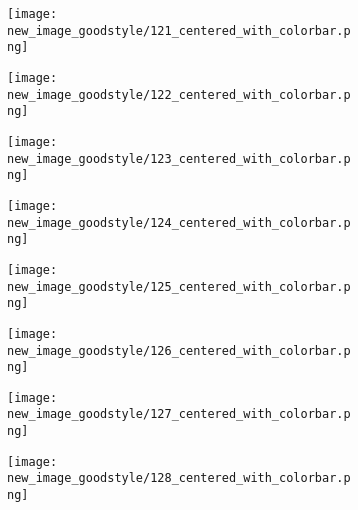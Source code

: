 \documentclass[a4paper,12pt]{article}
\begin{document}
\begin{figure}[H]
  \begin{subfigure}{0.11\textwidth}
    \texttt{[image: new\_image\_goodstyle/121\_centered\_with\_colorbar.png]}
  \end{subfigure}
  \hfill
  \begin{subfigure}{0.11\textwidth}
    \texttt{[image: new\_image\_goodstyle/122\_centered\_with\_colorbar.png]}
  \end{subfigure}
  \hfill
  \begin{subfigure}{0.11\textwidth}
    \texttt{[image: new\_image\_goodstyle/123\_centered\_with\_colorbar.png]}
  \end{subfigure}
  \hfill
  \begin{subfigure}{0.11\textwidth}
    \texttt{[image: new\_image\_goodstyle/124\_centered\_with\_colorbar.png]}
  \end{subfigure}
  \hfill
  \begin{subfigure}{0.11\textwidth}
    \texttt{[image: new\_image\_goodstyle/125\_centered\_with\_colorbar.png]}
  \end{subfigure}
  \hfill
  \begin{subfigure}{0.11\textwidth}
    \texttt{[image: new\_image\_goodstyle/126\_centered\_with\_colorbar.png]}
  \end{subfigure}
  \hfill
  \begin{subfigure}{0.11\textwidth}
    \texttt{[image: new\_image\_goodstyle/127\_centered\_with\_colorbar.png]}
  \end{subfigure}
  \hfill
  \begin{subfigure}{0.11\textwidth}
    \texttt{[image: new\_image\_goodstyle/128\_centered\_with\_colorbar.png]}
  \end{subfigure}
  \hfill
\end{figure}
\end{document}
